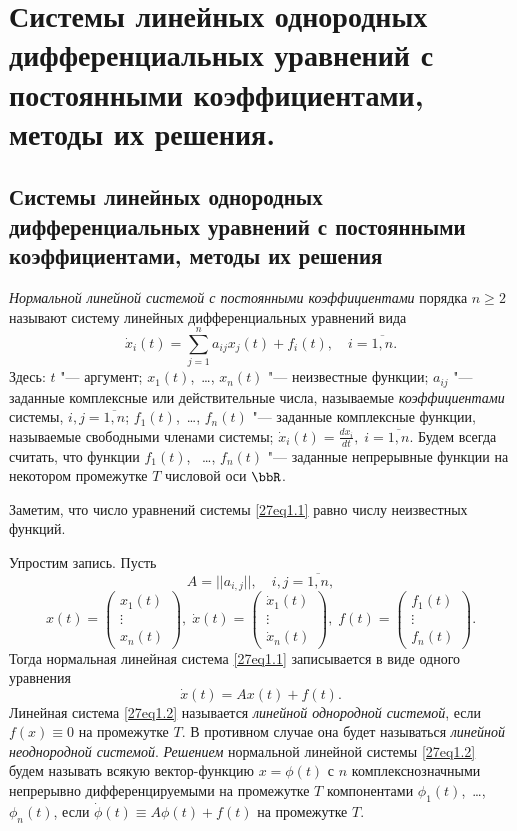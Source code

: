 \chapter{Системы линейных однородных дифференциальных уравнений с постоянными коэффициентами, методы их решения.}
\section{Системы линейных однородных дифференциальных уравнений с постоянными коэффициентами, методы их решения}
\begin{defn}\label{ch27defn1}
\textit{Нормальной линейной системой с постоянными коэффициентами} порядка $n\ge 2$ называют систему линейных дифференциальных уравнений вида
\begin{equation}\label{27eq1.1}
\dot x_i(t)=\sum\limits_{j=1}^n a_{ij}x_j(t)+f_i(t),\quad i=\overline{1,n}.
\end{equation}
Здесь: $t$ "--- аргумент; $x_1(t)$,~\dots, $x_n(t)$ "--- неизвестные функции; $a_{ij}$ "--- заданные комплексные или действительные числа, называемые \textit{коэффициентами} системы, $i,j=\overline{1,n}$; $f_1(t)$,~\dots, $f_n(t)$ "--- заданные комплексные функции, называемые свободными членами системы; $\dot x_i(t)=\frac{dx_i}{dt},\; i=\overline{1,n}$. Будем всегда считать, что функции $f_1(t)$, ~\dots, $f_n(t)$ "--- заданные непрерывные функции на некотором промежутке $T$ числовой оси $\bbR$.
\end{defn}
Заметим, что число уравнений системы \eqref{27eq1.1} равно числу неизвестных функций.

Упростим запись. Пусть
$$
A=||a_{i,j}||,\quad i,j=\overline{1,n},
$$
$$
x(t)=\begin{pmatrix}
x_1(t)\\ \vdots \\ x_n(t)
\end{pmatrix},\;
\dot x(t)=\begin{pmatrix}
\dot x_1(t)\\ \vdots \\ \dot x_n(t)
\end{pmatrix},\;
f(t)=\begin{pmatrix}
f_1(t)\\ \vdots \\ f_n(t)
\end{pmatrix}.
$$
Тогда нормальная линейная система \eqref{27eq1.1} записывается в виде одного уравнения 
\begin{equation} \label{27eq1.2}
\dot x(t)=Ax(t)+f(t).
\end{equation}
Линейная система \eqref{27eq1.2} называется \textit{линейной однородной системой}, если $f(x)\equiv 0$ на промежутке $T$. В противном случае она будет называться \textit{линейной неоднородной системой}. \textit{Решением} нормальной линейной системы \eqref{27eq1.2} будем называть всякую вектор-функцию  $x=\phi(t)$ с $n$ комплекснозначными непрерывно дифференцируемыми на промежутке $T$ компонентами $\phi_1(t)$,~\dots, $\phi_n(t)$, если $\dot \phi(t)\equiv A\phi(t)+f(t)$ на промежутке $T$.

